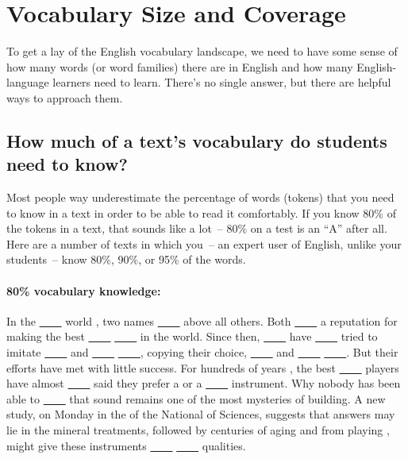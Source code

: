 \section{Vocabulary Size and Coverage} \label{sec:vocab-size-coverage}

To get a lay of the English vocabulary landscape, we need to have some sense of how many words (or word families) there are in English and how many English-language learners need to learn. There's no single answer, but there are helpful ways to approach them.

\subsection*{How much of a text's vocabulary do students need to know?}

Most people way underestimate the percentage of words (tokens) that you need to know in a text in order to be able to read it comfortably. If you know 80\% of the tokens in a text, that sounds like a lot~-- 80\% on a test is an ``A'' after all. Here are a number of texts in which you~-- an expert user of English, unlike your students~-- know 80\%, 90\%, or 95\% of the words.

\begin{mdframed}
\paragraph*{80\% vocabulary knowledge:}In the \uline{~~~~} world , two names \uline{~~~~} above all others. Both \uline{~~~~} a reputation for making the best \uline{~~~~}  \uline{~~~~} in the world. Since then, \uline{~~~~} have \uline{~~~~} tried to imitate \uline{~~~~} and  \uline{~~~~}  \uline{~~~~}, copying their choice, \uline{~~~~} and  \uline{~~~~}  \uline{~~~~}. But their efforts have met with little success. For hundreds of years , the best \uline{~~~~} players have almost \uline{~~~~} said they prefer a or a \uline{~~~~} instrument. Why nobody has been able to \uline{~~~~} that sound remains one of the most mysteries of building. A new study, on Monday in the of the National of Sciences, suggests that answers may lie in the mineral treatments, followed by centuries of aging and from playing , might give these instruments \uline{~~~~}  \uline{~~~~} qualities. 
\end{mdframed}

